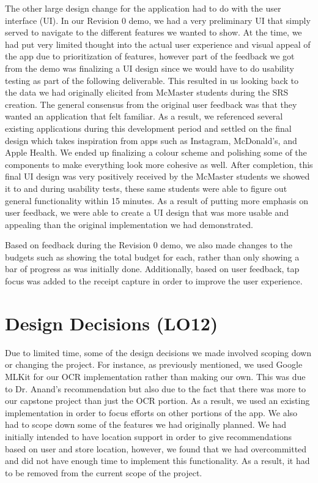 \documentclass{article}
\begin{document}
The other large design change for the application had to do with the user interface (UI). In our Revision 0 demo,
we had a very preliminary UI that simply served to navigate to the different features we wanted to show. At the time,
we had put very limited thought into the actual user experience and visual appeal of the app due to prioritization of
features, however part of the feedback we got from the demo was finalizing a UI design since we would have to do
usability testing as part of the following deliverable. This resulted in us looking back to the data we had originally
elicited from McMaster students during the SRS creation. The general consensus from the original user feedback was that
they wanted an application that felt familiar. As a result, we referenced several existing applications during this development
period and settled on the final design which takes inspiration from apps such as Instagram, McDonald's, and Apple Health. We ended
up finalizing a colour scheme and polishing some of the components to make everything look more cohesive as well. After
completion, this final UI design was very positively received by the McMaster students we showed it to and during usability tests, 
these same students were able to figure out general functionality within 15 minutes. As a result of putting more emphasis on
user feedback, we were able to create a UI design that was more usable and appealing than the original implementation we had
demonstrated.

Based on feedback during the Revision 0 demo, we also made changes to the budgets such as showing the total budget for each,
rather than only showing a bar of progress as was initially done. Additionally, based on user feedback, tap focus was added
to the receipt capture in order to improve the user experience.

\section{Design Decisions (LO12)}


Due to limited time, some of the design decisions we made involved scoping down or changing
the project. For instance, as previously mentioned, we used Google MLKit for our OCR implementation
rather than making our own. This was due to Dr. Anand's recommendation but also due to the fact that
there was more to our capstone project than just the OCR portion. As a result, we used an existing implementation
in order to focus efforts on other portions of the app. We also had to scope down some of the features we
had originally planned. We had initially intended to have location support in order to give recommendations
based on user and store location, however, we found that we had overcommitted and did not have enough time to
implement this functionality. As a result, it had to be removed from the current scope of the project.
\end{document}
